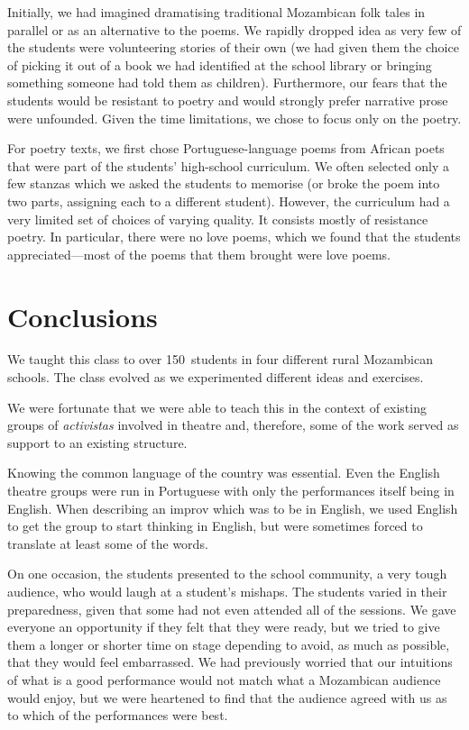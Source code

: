 \documentclass[article,twocolumn,twoside]{memoir}
\begin{document}
Initially, we had imagined dramatising traditional Mozambican folk tales in
parallel or as an alternative to the poems. We rapidly dropped idea as very
few of the students were volunteering stories of their own (we had given them
the choice of picking it out of a book we had identified at the school library
or bringing something someone had told them as children). Furthermore, our
fears that the students would be resistant to poetry and would strongly prefer
narrative prose were unfounded. Given the time limitations, we chose to focus
only on the poetry.

For poetry texts, we first chose Portuguese-language poems from African poets
that were part of the students' high-school curriculum. We often selected only
a few stanzas which we asked the students to memorise (or broke the poem into
two parts, assigning each to a different student). However, the curriculum had
a very limited set of choices of varying quality. It consists mostly of
resistance poetry. In particular, there were no love poems, which we found that
the students appreciated---most of the poems that them brought were love poems.

\chapter{Conclusions}

We taught this class to over 150~students in four different rural Mozambican
schools. The class evolved as we experimented different ideas and exercises.

We were fortunate that we were able to teach this in the context of existing
groups of \textit{activistas} involved in theatre and, therefore, some of the
work served as support to an existing structure.

Knowing the common language of the country was essential. Even the English
theatre groups were run in Portuguese with only the performances itself being
in English. When describing an improv which was to be in English, we used
English to get the group to start thinking in English, but were sometimes
forced to translate at least some of the words.

On one occasion, the students presented to the school community, a very tough
audience, who would laugh at a student's mishaps. The students varied in their
preparedness, given that some had not even attended all of the sessions. We
gave everyone an opportunity if they felt that they were ready, but we tried to
give them a longer or shorter time on stage depending to avoid, as much as
possible, that they would feel embarrassed. We had previously worried that our
intuitions of what is a good performance would not match what a Mozambican
audience would enjoy, but we were heartened to find that the audience agreed
with us as to which of the performances were best.
\end{document}
